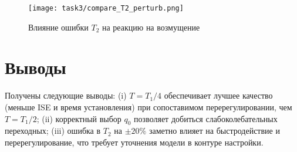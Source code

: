 \begin{figure}[H]
    \centering
    \texttt{[image: task3/compare\_T2\_perturb.png]}
    \caption{Влияние ошибки $T_2$ на реакцию на возмущение}
\end{figure}

\section{Выводы}
Получены следующие выводы: (i) $T=T_1/4$ обеспечивает лучшее качество (меньше ISE и время установления) при сопоставимом перерегулировании, чем $T=T_1/2$; (ii) корректный выбор $q_0$ позволяет добиться слабоколебательных переходных; (iii) ошибка в $T_2$ на $\pm20\%$ заметно влияет на быстродействие и перерегулирование, что требует уточнения модели в контуре настройки.


